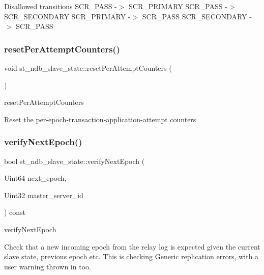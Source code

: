 Disallowed transitions S\+C\+R\+\_\+\+P\+A\+SS -\/$>$ S\+C\+R\+\_\+\+P\+R\+I\+M\+A\+RY S\+C\+R\+\_\+\+P\+A\+SS -\/$>$ S\+C\+R\+\_\+\+S\+E\+C\+O\+N\+D\+A\+RY S\+C\+R\+\_\+\+P\+R\+I\+M\+A\+RY -\/$>$ S\+C\+R\+\_\+\+P\+A\+SS S\+C\+R\+\_\+\+S\+E\+C\+O\+N\+D\+A\+RY -\/$>$ S\+C\+R\+\_\+\+P\+A\+SS\mbox{\label{structst__ndb__slave__state_a366692bd209be04ea4b61608dcc2780e}} 
\subsubsection{\texorpdfstring{reset\+Per\+Attempt\+Counters()}{resetPerAttemptCounters()}}
{\footnotesize\ttfamily void st\+\_\+ndb\+\_\+slave\+\_\+state\+::reset\+Per\+Attempt\+Counters (\begin{DoxyParamCaption}{ }\end{DoxyParamCaption})}

reset\+Per\+Attempt\+Counters

Reset the per-\/epoch-\/transaction-\/application-\/attempt counters \mbox{\label{structst__ndb__slave__state_a726e16b6e2106a13558117de0ba37757}} 
\subsubsection{\texorpdfstring{verify\+Next\+Epoch()}{verifyNextEpoch()}}
{\footnotesize\ttfamily bool st\+\_\+ndb\+\_\+slave\+\_\+state\+::verify\+Next\+Epoch (\begin{DoxyParamCaption}\item[{Uint64}]{next\+\_\+epoch,  }\item[{Uint32}]{master\+\_\+server\+\_\+id }\end{DoxyParamCaption}) const}

verify\+Next\+Epoch

Check that a new incoming epoch from the relay log is expected given the current slave state, previous epoch etc. This is checking Generic replication errors, with a user warning thrown in too. 

